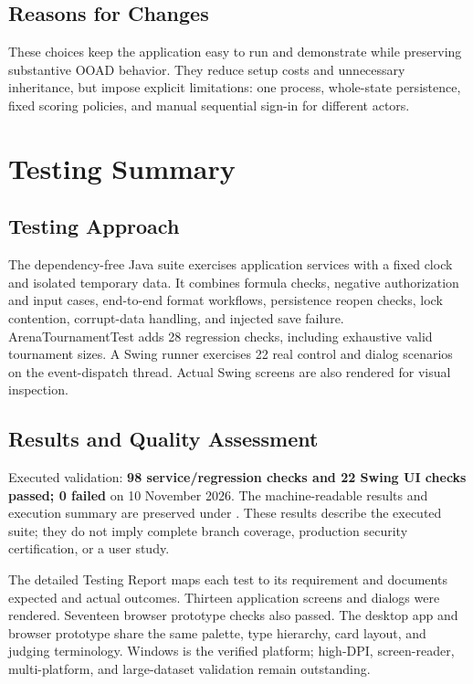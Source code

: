 \documentclass[12pt]{article}
\begin{document}
\subsection{Reasons for Changes}
These choices keep the application easy to run and demonstrate while preserving substantive OOAD behavior. They reduce setup costs and unnecessary inheritance, but impose explicit limitations: one process, whole-state persistence, fixed scoring policies, and manual sequential sign-in for different actors.

\section{Testing Summary}
\subsection{Testing Approach}
The dependency-free Java suite exercises application services with a fixed clock and isolated temporary data. It combines formula checks, negative authorization and input cases, end-to-end format workflows, persistence reopen checks, lock contention, corrupt-data handling, and injected save failure. ArenaTournamentTest adds 28 regression checks, including exhaustive valid tournament sizes. A Swing runner exercises 22 real control and dialog scenarios on the event-dispatch thread. Actual Swing screens are also rendered for visual inspection.
\subsection{Results and Quality Assessment}
\begin{objectivebox}
Executed validation: \textbf{98 service/regression checks and 22 Swing UI checks passed; 0 failed} on 10 November 2026. The machine-readable results and execution summary are preserved under . These results describe the executed suite; they do not imply complete branch coverage, production security certification, or a user study.
\end{objectivebox}
The detailed Testing Report maps each test to its requirement and documents expected and actual outcomes. Thirteen application screens and dialogs were rendered. Seventeen browser prototype checks also passed. The desktop app and browser prototype share the same palette, type hierarchy, card layout, and judging terminology. Windows is the verified platform; high-DPI, screen-reader, multi-platform, and large-dataset validation remain outstanding.
\end{document}
